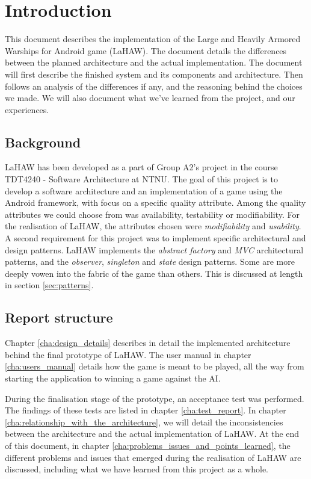 \chapter{Introduction}

This document describes the implementation of the Large and Heavily Armored Warships for Android game (LaHAW). The document details the differences between the planned architecture and the actual implementation. The document will first describe the finished system and its components and architecture. Then follows an analysis of the differences if any, and the reasoning behind the choices we made. We will also document what we've learned from the project, and our experiences.

\section{Background}
LaHAW has been developed as a part of Group A2's project in the course TDT4240 - Software Architecture at NTNU. The goal of this project is to develop a software architecture and an implementation of a game using the Android framework, with focus on a specific quality attribute. Among the quality attributes we could choose from was availability, testability or modifiability. %
For the realisation of LaHAW, the attributes chosen were \emph{modifiability} and \emph{usability}.
A second requirement for this project was to implement specific architectural and design patterns. LaHAW implements the \emph{abstract factory} and \emph{MVC} architectural patterns, and the \emph{observer}, \emph{singleton} and \emph{state} design patterns. Some are more deeply vowen into the fabric of the game than others. This is discussed at length in section \ref{sec:patterns}.


\section{Report structure}

Chapter \ref{cha:design_details} describes in detail the implemented architecture behind the final prototype of LaHAW.
The user manual in chapter \ref{cha:users_manual} details how the game is meant to be played, all the way from starting the application to winning a game against the AI.

During the finalisation stage of the prototype, an acceptance test was performed. The findings of these tests are listed in chapter \ref{cha:test_report}.
In chapter \ref{cha:relationship_with_the_architecture}, we will detail the inconsistencies between the architecture and the actual implementation of LaHAW.
At the end of this document, in chapter \ref{cha:problems_issues_and_points_learned}, the different problems and issues that emerged during the realisation of LaHAW are discussed, including what we have learned from this project as a whole.